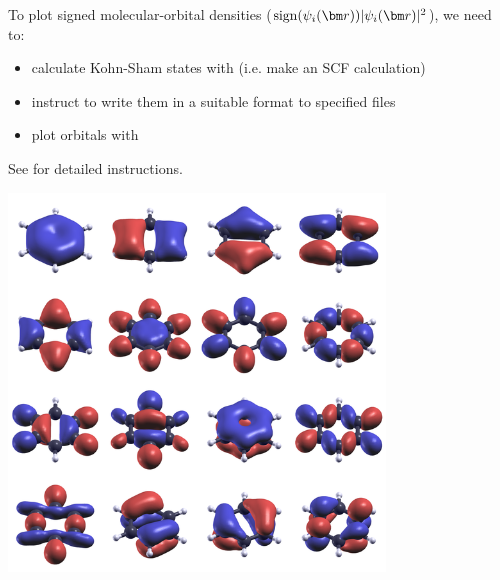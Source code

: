 \documentclass[landscape]{foils}
\begin{document}
To plot signed molecular-orbital densities
($\sign(\psi_i(\vr))|\psi_i(\vr)|^2$), we need to:
\begin{itemize}
\item calculate Kohn-Sham states with  (i.e. make an
  SCF calculation)
\item instruct  to write them in a suitable format to
  specified files
\item plot orbitals with 
\end{itemize}
See  for detailed instructions.
\vspace{-4cm}
\begin{flushright}
  \includegraphics[width=10cm]{figs/psi2-benzene.png}  
\end{flushright}

\end{document}
